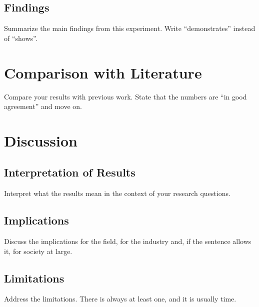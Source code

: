 \subsection{Findings}

Summarize the main findings from this experiment. Write ``demonstrates''
instead of ``shows''.

\section{Comparison with Literature}

Compare your results with previous work. State that the numbers are
``in good agreement'' and move on.

\section{Discussion}

\subsection{Interpretation of Results}

Interpret what the results mean in the context of your research
questions.

\subsection{Implications}

Discuss the implications for the field, for the industry and, if the
sentence allows it, for society at large.

\subsection{Limitations}

Address the limitations. There is always at least one, and it is
usually time.
